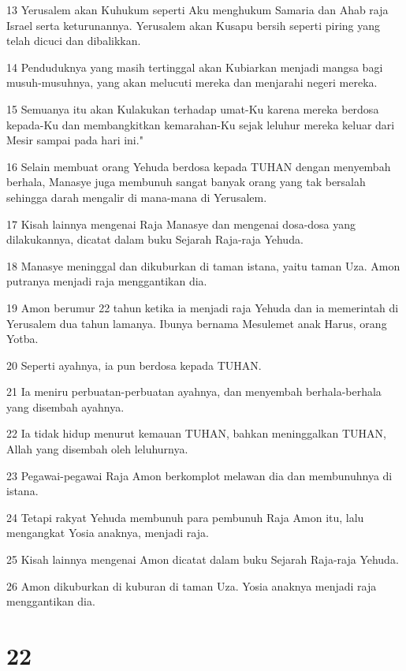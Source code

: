 \par 13 Yerusalem akan Kuhukum seperti Aku menghukum Samaria dan Ahab raja Israel serta keturunannya. Yerusalem akan Kusapu bersih seperti piring yang telah dicuci dan dibalikkan.
\par 14 Penduduknya yang masih tertinggal akan Kubiarkan menjadi mangsa bagi musuh-musuhnya, yang akan melucuti mereka dan menjarahi negeri mereka.
\par 15 Semuanya itu akan Kulakukan terhadap umat-Ku karena mereka berdosa kepada-Ku dan membangkitkan kemarahan-Ku sejak leluhur mereka keluar dari Mesir sampai pada hari ini."
\par 16 Selain membuat orang Yehuda berdosa kepada TUHAN dengan menyembah berhala, Manasye juga membunuh sangat banyak orang yang tak bersalah sehingga darah mengalir di mana-mana di Yerusalem.
\par 17 Kisah lainnya mengenai Raja Manasye dan mengenai dosa-dosa yang dilakukannya, dicatat dalam buku Sejarah Raja-raja Yehuda.
\par 18 Manasye meninggal dan dikuburkan di taman istana, yaitu taman Uza. Amon putranya menjadi raja menggantikan dia.
\par 19 Amon berumur 22 tahun ketika ia menjadi raja Yehuda dan ia memerintah di Yerusalem dua tahun lamanya. Ibunya bernama Mesulemet anak Harus, orang Yotba.
\par 20 Seperti ayahnya, ia pun berdosa kepada TUHAN.
\par 21 Ia meniru perbuatan-perbuatan ayahnya, dan menyembah berhala-berhala yang disembah ayahnya.
\par 22 Ia tidak hidup menurut kemauan TUHAN, bahkan meninggalkan TUHAN, Allah yang disembah oleh leluhurnya.
\par 23 Pegawai-pegawai Raja Amon berkomplot melawan dia dan membunuhnya di istana.
\par 24 Tetapi rakyat Yehuda membunuh para pembunuh Raja Amon itu, lalu mengangkat Yosia anaknya, menjadi raja.
\par 25 Kisah lainnya mengenai Amon dicatat dalam buku Sejarah Raja-raja Yehuda.
\par 26 Amon dikuburkan di kuburan di taman Uza. Yosia anaknya menjadi raja menggantikan dia.

\chapter{22}

